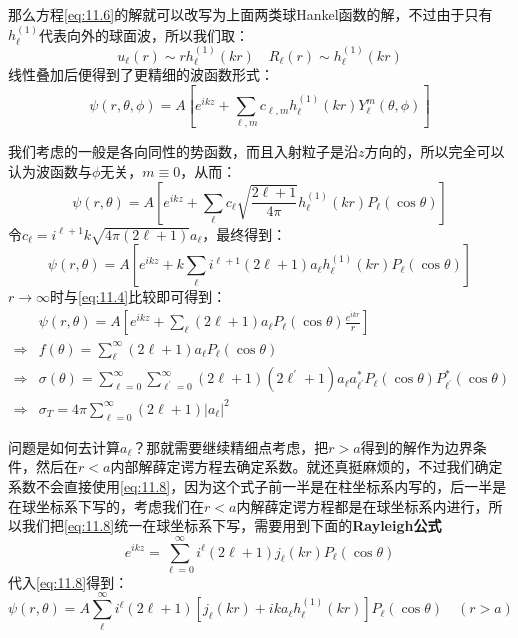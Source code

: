 \documentclass[a4paper,zihao=-4,linespread=1]{ctexrep}
\begin{document}
	那么方程\ref{eq:11.6}的解就可以改写为上面两类球Hankel函数的解，不过由于只有$h^{(1)}_\ell$代表向外的球面波，所以我们取：
	\[u_\ell(r)\sim rh^{(1)}_\ell(kr)\quad R_\ell(r)\sim h^{(1)}_\ell(kr)\]
	线性叠加后便得到了更精细的波函数形式：
	\begin{equation}
		\psi(r,\theta,\phi)=A\left[e^{ikz}+\sum_{\ell,m}c_{\ell,m}h^{(1)}_\ell(kr)Y^m_\ell(\theta,\phi)\right]
	\end{equation}

	我们考虑的一般是各向同性的势函数，而且入射粒子是沿$z$方向的，所以完全可以认为波函数与$\phi$无关，$m\equiv 0$，从而：
	\[\psi(r,\theta)=A\left[e^{ikz}+\sum_{\ell}c_{\ell}\sqrt{\frac{2\ell+1}{4\pi}}h^{(1)}_\ell(kr)P_\ell(\cos\theta)\right]\]
	令$c_\ell=i^{\ell+1}k\sqrt{4\pi(2\ell+1)}a_\ell$，最终得到：
	\begin{equation}
		\label{eq:11.8}
		\psi(r,\theta)=A\left[e^{ikz}+k\sum_{\ell}i^{\ell+1}(2\ell+1)a_\ell h^{(1)}_\ell(kr)P_\ell(\cos\theta)\right]
	\end{equation}
	$r\to\infty$时与\ref{eq:11.4}比较即可得到：
	\begin{equation}
		\label{eq:11.9}
		\begin{aligned}
		&\psi(r,\theta)=A\left[e^{ikz}+\sum_{\ell}(2\ell+1)a_\ell P_\ell(\cos\theta)\frac{e^{ikr}}{r}\right]\\
		\Rightarrow&f(\theta)=\sum_\ell^\infty (2\ell+1)a_\ell P_\ell(\cos\theta)\\
		\Rightarrow&\sigma(\theta)=\sum_{\ell=0}^\infty\sum_{\ell^\prime=0}^\infty(2\ell+1)(2\ell^\prime+1)a_\ell a_{\ell^\prime}^* P_\ell(\cos\theta) P_{\ell^\prime}^*(\cos\theta)\\
		\Rightarrow&\sigma_T=4\pi\sum_{\ell=0}^\infty(2\ell+1)|a_\ell|^2
		\end{aligned}
	\end{equation}
	
	问题是如何去计算$a_\ell$？那就需要继续精细点考虑，把$r>a$得到的解作为边界条件，然后在$r<a$内部解薛定谔方程去确定系数。就还真挺麻烦的，不过我们确定系数不会直接使用\ref{eq:11.8}，因为这个式子前一半是在柱坐标系内写的，后一半是在球坐标系下写的，考虑我们在$r<a$内解薛定谔方程都是在球坐标系内进行，所以我们把\ref{eq:11.8}统一在球坐标系下写，需要用到下面的\textbf{Rayleigh公式}
	\begin{equation}
		\label{eq:11.10}
		e^{ikz}=\sum_{\ell=0}^\infty i^\ell(2\ell+1)j_\ell(kr)P_\ell(\cos\theta)
	\end{equation}
	代入\ref{eq:11.8}得到：
	\begin{equation}
		\label{eq:11.11}
		\boxed{
		\psi(r,\theta)=A\sum_\ell^\infty i^\ell(2\ell+1)\left[j_\ell(kr)+ika_\ell h^{(1)}_\ell(kr)\right]P_\ell(\cos\theta)\quad(r>a)
	}
	\end{equation}
	
\end{document}
